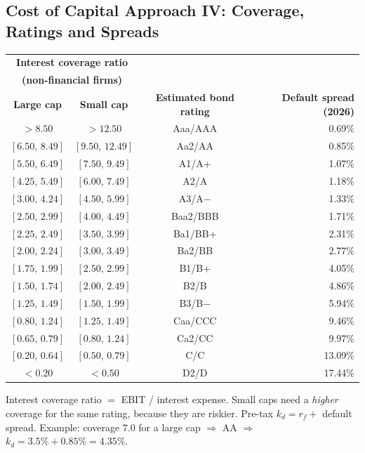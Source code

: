 \subsection[Cost of Capital Approach IV: Coverage, Ratings and Spreads]{Cost of Capital Approach IV: Coverage, Ratings and Spreads }

\begin{center}
\small
\begin{tabular}{@{}cccr@{}}
\toprule
\multicolumn{2}{c}{\textbf{Interest coverage ratio}} & & \\
\multicolumn{2}{c}{\textbf{(non-financial firms)}} & & \\
\textbf{Large cap} & \textbf{Small cap} & \textbf{Estimated bond rating} & \textbf{Default spread (2026)}\\
\midrule
$>8.50$ & $>12.50$ & Aaa/AAA & 0.69\%\\
$[6.50,\,8.49]$ & $[9.50,\,12.49]$ & Aa2/AA & 0.85\%\\
$[5.50,\,6.49]$ & $[7.50,\,9.49]$ & A1/A+ & 1.07\%\\
$[4.25,\,5.49]$ & $[6.00,\,7.49]$ & A2/A & 1.18\%\\
$[3.00,\,4.24]$ & $[4.50,\,5.99]$ & A3/A$-$ & 1.33\%\\
$[2.50,\,2.99]$ & $[4.00,\,4.49]$ & Baa2/BBB & 1.71\%\\
$[2.25,\,2.49]$ & $[3.50,\,3.99]$ & Ba1/BB+ & 2.31\%\\
$[2.00,\,2.24]$ & $[3.00,\,3.49]$ & Ba2/BB & 2.77\%\\
$[1.75,\,1.99]$ & $[2.50,\,2.99]$ & B1/B+ & 4.05\%\\
$[1.50,\,1.74]$ & $[2.00,\,2.49]$ & B2/B & 4.86\%\\
$[1.25,\,1.49]$ & $[1.50,\,1.99]$ & B3/B$-$ & 5.94\%\\
$[0.80,\,1.24]$ & $[1.25,\,1.49]$ & Caa/CCC & 9.46\%\\
$[0.65,\,0.79]$ & $[0.80,\,1.24]$ & Ca2/CC & 9.97\%\\
$[0.20,\,0.64]$ & $[0.50,\,0.79]$ & C/C & 13.09\%\\
$<0.20$ & $<0.50$ & D2/D & 17.44\%\\
\bottomrule
\end{tabular}
\end{center}
\begin{addbox}
Interest coverage ratio $=$ EBIT / interest expense. Small caps need a \emph{higher} coverage for the same rating, because they are riskier. Pre-tax $k_d=r_f+$ default spread. Example: coverage 7.0 for a large cap $\Rightarrow$ AA $\Rightarrow$ $k_d=3.5\%+0.85\%=4.35\%$.
\end{addbox}

